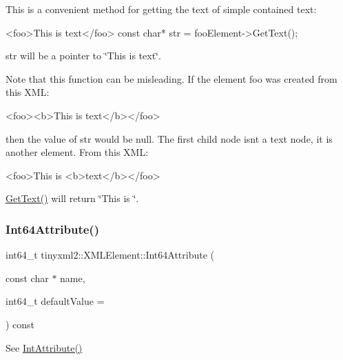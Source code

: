 This is a convenient method for getting the text of simple contained text\+: \begin{DoxyVerb}<foo>This is text</foo>
    const char* str = fooElement->GetText();
\end{DoxyVerb}


\textquotesingle{}str\textquotesingle{} will be a pointer to \char`\"{}\+This is text\char`\"{}.

Note that this function can be misleading. If the element foo was created from this X\+ML\+: \begin{DoxyVerb}    <foo><b>This is text</b></foo>
\end{DoxyVerb}


then the value of str would be null. The first child node isn\textquotesingle{}t a text node, it is another element. From this X\+ML\+: \begin{DoxyVerb}    <foo>This is <b>text</b></foo>
\end{DoxyVerb}
 \mbox{\hyperlink{classtinyxml2_1_1_x_m_l_element_a0fa5bea0a4daf3ddd503dcabb823eba6}{Get\+Text()}} will return \char`\"{}\+This is \char`\"{}. \mbox{\label{classtinyxml2_1_1_x_m_l_element_a66d96972adecd816194191f13cc4a0a0}} 
\subsubsection{\texorpdfstring{Int64\+Attribute()}{Int64Attribute()}}
{\footnotesize\ttfamily int64\+\_\+t tinyxml2\+::\+X\+M\+L\+Element\+::\+Int64\+Attribute (\begin{DoxyParamCaption}\item[{const char $\ast$}]{name,  }\item[{int64\+\_\+t}]{default\+Value = {} }\end{DoxyParamCaption}) const}



See \mbox{\hyperlink{classtinyxml2_1_1_x_m_l_element_a95a89b13bb14a2d4655e2b5b406c00d4}{Int\+Attribute()}} 

\mbox{\label{classtinyxml2_1_1_x_m_l_element_aab6151f7e3b4c2c0a8234e262d7b6b8a}} 
